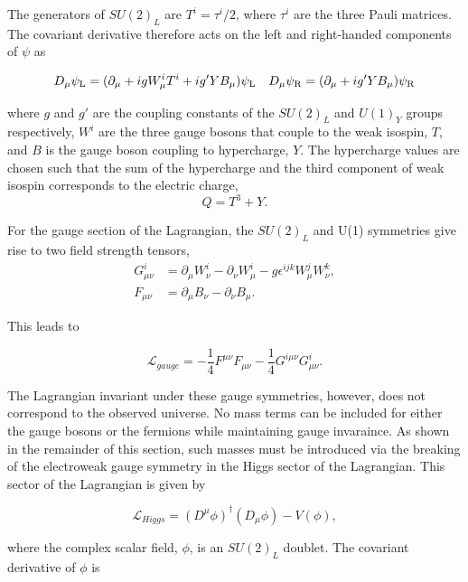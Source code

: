 \noindent The generators of $SU(2)_L$ are $T^i = \tau^i/2$, where $\tau^i$ are the three Pauli matrices. 
The covariant derivative therefore acts on the left and right-handed components of $\psi$ as

\begin{equation}
D_{\mu} \psi_{\mathrm{L}} = (\partial_\mu + igW^i_{\mu}T^i + ig'YB_\mu)\psi_{\mathrm{L}} \quad D_{\mu} \psi_{\mathrm{R}} = (\partial_\mu + ig'YB_\mu)\psi_{\mathrm{R}}
\end{equation}

\noindent where $g$ and $g'$ are the coupling constants of the $SU(2)_L$ and $U(1)_Y$ groups respectively, 
$W^i$ are the three gauge bosons that couple to the weak isospin, $T$, and $B$ is the gauge boson
coupling to hypercharge, $Y$. The hypercharge values are chosen such that the sum of the hypercharge and 
the third component of weak isospin corresponds to the electric charge,
\begin{equation}
\label{equ:charge}
Q = T^{3} + Y.
\end{equation}

\noindent For the gauge section of the Lagrangian, the $SU(2)_L$ and U(1) symmetries give rise to two field strength tensors,
\begin{align}
G^i_{\mu\nu} &= \partial_\mu W^i_\nu - \partial_\nu W^i_\mu - g \epsilon^{ijk}W^j_\mu W^k_\nu,\\
F_{\mu\nu} &= \partial_\mu B_\nu - \partial_\nu B_\mu.
\end{align}

\noindent This leads to

\begin{equation}
\mathcal{L}_{gauge} = -\frac{1}{4}F^{\mu\nu}F_{\mu\nu} - \frac{1}{4}G^{i\mu\nu}G^{i}_{\mu\nu}.
\end{equation}

\noindent The Lagrangian invariant under these gauge symmetries, however, does not correspond to the observed universe. No mass terms
can be included for either the gauge bosons or the fermions while maintaining gauge invaraince.
As shown in the remainder of this section, such masses must be introduced via the breaking
of the electroweak gauge symmetry in the Higgs sector of the Lagrangian. This 
sector of the Lagrangian is given by

\begin{equation}
\label{equ:higgs-lagrangian}
\mathcal{L}_{Higgs} = (D^{\mu}\phi)^{\dagger}(D_{\mu}\phi) - V(\phi),
\end{equation}

\noindent where the complex scalar field, $\phi$, is an $SU(2)_L$ doublet. The covariant derivative of $\phi$ is

